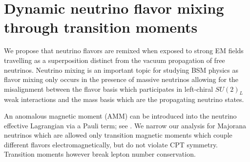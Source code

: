 \chapter{Dynamic neutrino flavor mixing through transition moments}
\label{chap:neutrino}
We propose that neutrino flavors are remixed when exposed to strong EM fields travelling as a superposition distinct from the vacuum propagation of free neutrinos. Neutrino mixing is an important topic for studying BSM physics as flavor mixing only occurs in the presence of massive neutrinos allowing for the misalignment between the flavor basis which participates in left-chiral $SU(2)_{L}$ weak interactions and the mass basis which are the propagating neutrino states.

An anomalous magnetic moment (AMM) can be introduced into the neutrino effective Lagrangian via a Pauli term; see . We narrow our analysis for Majorana neutrinos which are allowed only transition magnetic moments which couple different flavors electromagnetically, but do not violate CPT symmetry. Transition moments however break lepton number conservation.



